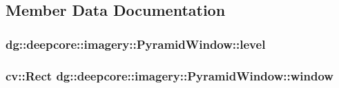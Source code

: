 \subsection{Member Data Documentation}
\subsubsection[{\texorpdfstring{level}{level}}]{ dg\+::deepcore\+::imagery\+::\+Pyramid\+Window\+::level}\hypertarget{structdg_1_1deepcore_1_1imagery_1_1_pyramid_window_aa08adb03843e4cd955b767c82d54e335}{}\label{structdg_1_1deepcore_1_1imagery_1_1_pyramid_window_aa08adb03843e4cd955b767c82d54e335}
\subsubsection[{\texorpdfstring{window}{window}}]{\setlength{\rightskip}{0pt plus 5cm}cv\+::\+Rect dg\+::deepcore\+::imagery\+::\+Pyramid\+Window\+::window}\hypertarget{structdg_1_1deepcore_1_1imagery_1_1_pyramid_window_aa7e015320172969330a744d0da0c5ad3}{}\label{structdg_1_1deepcore_1_1imagery_1_1_pyramid_window_aa7e015320172969330a744d0da0c5ad3}

